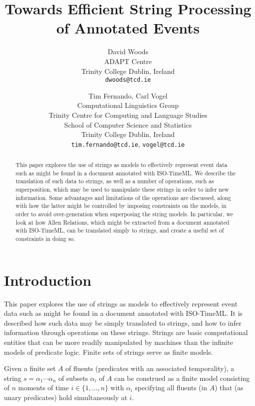 \documentclass[a4paper,11pt,leqno]{article}
\title{Towards Efficient String Processing of Annotated Events}
\date{}
\author{David Woods\\
	ADAPT Centre\\
	Trinity College Dublin, Ireland\\
	\texttt{dwoods@tcd.ie}
	\and Tim Fernando, Carl Vogel\\
	Computational Linguistics Group \\
	Trinity Centre for Computing and Language Studies\\
	School of Computer Science and Statistics\\
	Trinity College Dublin, Ireland\\
	\texttt{tim.fernando@tcd.ie}, \texttt{vogel@tcd.ie}
}
\begin{document}
\maketitle
\thispagestyle{empty}
\pagestyle{empty}
\begin{abstract}
\noindent
This paper explores the use of strings as models to effectively represent event 
data such as might be found in a document annotated with ISO-TimeML. We 
describe 
the translation of such data to strings, as well as a number of operations, 
such as superposition, which may be used to manipulate these strings in order 
to infer new information. Some advantages and limitations of the operations are 
discussed, along with how the latter might be controlled by imposing 
constraints on the models, in order to avoid over-generation when superposing 
the string models. In particular, we look at how Allen Relations, which might 
be extracted from a document annotated with ISO-TimeML, can be translated 
simply to 
strings, and create a useful set of constraints in doing so.
\end{abstract}
\section{Introduction}\label{intro}
This paper explores the use of strings as models to effectively represent event 
data such as might be found in a document annotated with ISO-TimeML. It is 
described how such data may be simply translated to strings, and how to infer 
information through operations on these strings. Strings are basic 
computational entities that can be more readily manipulated by machines than 
the infinite models of predicate logic. Finite sets of strings serve as finite 
models.

Given a finite set $A$ of fluents (predicates with an associated temporality), 
a string $s=\alpha_1 \cdots \alpha_n$ 
of subsets $\alpha_i$ of $A$ can be construed as a finite model 
consisting of $n$ moments of time $i \in \{1, \ldots, n\}$ with $\alpha_i$ 
specifying all fluents (in $A$) that (as unary predicates) hold simultaneously 
at $i$.
\end{document}
